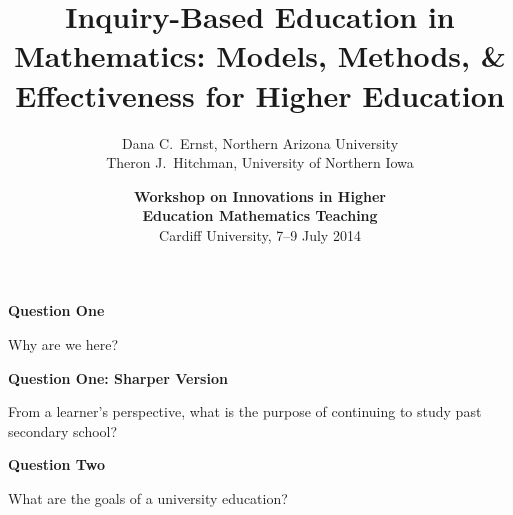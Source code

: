 \documentclass[10pt,handout]{beamer}
\begin{document}

\title[Inquiry-Based Education in Mathematics]
{\large \textbf{Inquiry-Based Education in Mathematics: Models, Methods, \& Effectiveness for Higher Education}}
\author[D.C.~Ernst and TJ Hitchman]{Dana C.~Ernst, Northern Arizona University\\
Theron J.~Hitchman, University of Northern Iowa}

\vspace{1em}

\date{\textbf{Workshop on Innovations in Higher\\ Education Mathematics Teaching}\\
Cardiff University, 7--9 July 2014}

\frame{\titlepage}

\begin{frame}

\vfill
\begin{center}
\end{center}
\vfill

\end{frame}


\begin{frame}{\textbf{Question One}}

\begin{center}{\Huge Why are we here?}\end{center}

\end{frame}

\begin{frame}{\textbf{Question One: Sharper Version}}

\begin{center}{\Huge From a learner's perspective, what is the purpose of continuing to study past secondary school?}\end{center}

\end{frame}

\begin{frame}{\textbf{Question Two}}

\begin{center}{\Huge What are the goals of a university education?}\end{center}

\end{frame}
\end{document}
